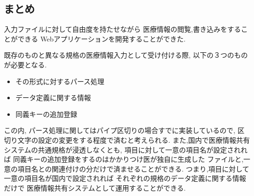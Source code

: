 \subsection{まとめ}
	入力ファイルに対して自由度を持たせながら
	医療情報の閲覧,書き込みをすることができる
	Webアプリケーションを開発することができた.

	既存のものと異なる規格の医療情報入力として受け付ける際,
	以下の３つのものが必要となる.

	\begin{itemize}
		\item その形式に対するパース処理
		\item データ定義に関する情報
		\item  同義キーの追加登録
	\end{itemize}

	この内, パース処理に関してはパイプ区切りの場合すでに実装しているので,
	区切り文字の設定の変更をする程度で済むと考えられる.
	また,国内で医療情報共有システムの共通規格が浸透しなくとも,
	項目に対して一意の項目名が設定されれば
	同義キーの追加登録をするのはかかりつけ医が独自に生成した
	ファイルと,一意の項目名との関連付けの分だけで済ませることができる.
	つまり,項目に対して一意の項目名が国内で設定されれば
	それぞれの規格のデータ定義に関する情報だけで
	医療情報共有システムとして運用することができる.
